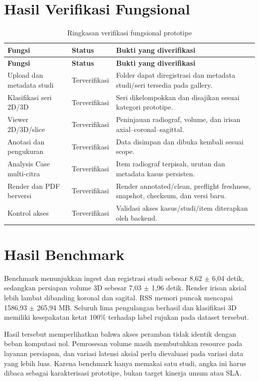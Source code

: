 \documentclass[12pt,a4paper,oneside]{report}
\begin{document}
\section{Hasil Verifikasi Fungsional}
\begin{longtable}{p{4.2cm}p{2cm}p{5.7cm}}
\caption{Ringkasan verifikasi fungsional prototipe}\label{tab:verifikasi}\\
\toprule\textbf{Fungsi} & \textbf{Status} & \textbf{Bukti yang diverifikasi}\\\midrule
\endfirsthead
\toprule\textbf{Fungsi} & \textbf{Status} & \textbf{Bukti yang diverifikasi}\\\midrule\endhead
Upload dan metadata studi & Terverifikasi & Folder dapat diregistrasi dan metadata studi/seri tersedia pada gallery.\\
Klasifikasi seri 2D/3D & Terverifikasi & Seri dikelompokkan dan disajikan sesuai kategori prototipe.\\
Viewer 2D/3D/slice & Terverifikasi & Peninjauan radiograf, volume, dan irisan axial--coronal--sagittal.\\
Anotasi dan pengukuran & Terverifikasi & Data disimpan dan dibuka kembali sesuai scope.\\
Analysis Case multi-citra & Terverifikasi & Item radiograf terpisah, urutan dan metadata kasus persisten.\\
Render dan PDF berversi & Terverifikasi & Render annotated/clean, preflight freshness, snapshot, checksum, dan versi baru.\\
Kontrol akses & Terverifikasi & Validasi akses kasus/studi/item diterapkan oleh backend.\\
\bottomrule
\end{longtable}

\section{Hasil Benchmark}
Benchmark menunjukkan ingest dan registrasi studi sebesar 8,62 $\pm$ 6,04 detik, sedangkan persiapan volume 3D sebesar 7,03 $\pm$ 1,96 detik. Render irisan aksial lebih lambat dibanding koronal dan sagital. RSS memori puncak mencapai 1586,93 $\pm$ 265,94 MB. Seluruh lima pengulangan berhasil dan klasifikasi 3D memiliki kesepakatan ketat 100\% terhadap label rujukan pada dataset tersebut.

Hasil tersebut memperlihatkan bahwa akses peramban tidak identik dengan beban komputasi nol. Pemrosesan volume masih membutuhkan resource pada layanan persiapan, dan variasi latensi aksial perlu dievaluasi pada variasi data yang lebih luas. Karena benchmark hanya memakai satu studi, angka ini harus dibaca sebagai karakterisasi prototipe, bukan target kinerja umum atau SLA.
\end{document}
